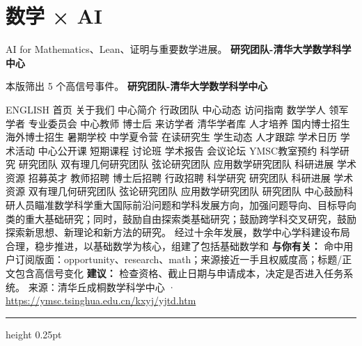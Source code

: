 \documentclass[10.5pt]{ctexart}
\begin{document}
\section*{数学 × AI}
{\color{ormuted} AI for Mathematics、Lean、证明与重要数学进展。}
\vspace{2mm}
{\LARGE\bfseries 研究团队-清华大学数学科学中心}\par
\vspace{1mm}
{\color{ormuted} 本版筛出 5 个高信号事件。}
\vspace{3mm}
{\Large\bfseries 研究团队-清华大学数学科学中心}\par
ENGLISH 首页 关于我们 中心简介 行政团队 中心动态 访问指南 数学学人 领军学者 专业委员会 中心教师 博士后 来访学者 清华学者库 人才培养 国内博士招生 海外博士招生 暑期学校 中学夏令营 在读研究生 学生动态 人才跟踪 学术日历 学术活动 中心公开课 短期课程 讨论班 学术报告 会议论坛 YMSC教室预约 科学研究 研究团队 双有理几何研究团队 弦论研究团队 应用数学研究团队 科研进展 学术资源 招募英才 教师招聘 博士后招聘 行政招聘 科学研究 研究团队 科研进展 学术资源 双有理几何研究团队 弦论研究团队 应用数学研究团队 研究团队 中心鼓励科研人员瞄准数学科学重大国际前沿问题和学科发展方向，加强问题导向、目标导向类的重大基础研究；同时，鼓励自由探索类基础研究；鼓励跨学科交叉研究，鼓励探索新思想、新理论和新方法的研究。 经过十余年发展，数学中心学科建设布局合理，稳步推进，以基础数学为核心，组建了包括基础数学和
\textbf{与你有关：} 命中用户订阅版面：opportunity、research、math；来源接近一手且权威度高；标题/正文包含高信号变化
\textbf{建议：} 检查资格、截止日期与申请成本，决定是否进入任务系统。
{\footnotesize\color{ormuted} 来源：清华丘成桐数学科学中心 · \url{https://ymsc.tsinghua.edu.cn/kxyj/yjtd.htm}}
\vspace{4mm}
\hrule height 0.25pt
\vspace{3mm}
\end{document}
